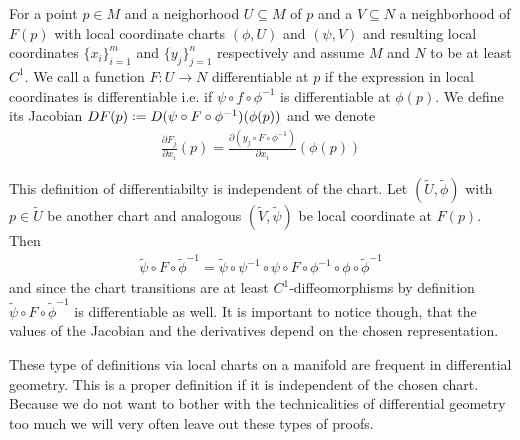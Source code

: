 \documentclass[12pt,a4paper]{article}
\numberwithin{equation}{subsection}
\numberwithin{lemma}{subsection}
\theoremstyle{definition}
\begin{document}
For a point $p \in M$ and a neighorhood $U \subseteq M$ of $p$ and 
a $V \subseteq N$ a neighborhood of $F(p)$ with local coordinate charts 
$(\phi, U)$ and $(\psi, V)$  and resulting local coordinates 
$\{x_i\}_{i=1}^m$ and $\{ y_j\}_{j=1}^n$ respectively and assume 
$M$ and $N$ to be at least $C^1$. We call a function 
$F: U \rightarrow N$ differentiable at $p$ if the expression in local coordinates
is differentiable i.e. if 
$\psi \circ f \circ \phi^{-1}$ is differentiable
at $\phi(p)$.
We define its Jacobian $DF(p) \vcentcolon= D(\psi \circ F \circ \phi^{-1})(\phi(p))$ 
and we denote 
\begin{align}
    \frac{\partial F_j}{\partial x_i}(p) 
    = \frac{\partial (y_j \circ F \circ \phi^{-1})}{\partial x_i} (\phi(p))
    \label{eq:derivative_on_manifold} 
\end{align}

This definition of differentiabilty is independent of the chart. 
Let $(\tilde{U},\tilde{\phi})$ with $p \in \tilde{U}$ be 
another chart and analogous $(\tilde{V},\tilde{\psi})$ be local coordinate 
at $F(p)$.
Then 
\begin{align*}
    \tilde{\psi} \circ F \circ \tilde{\phi}^{-1} 
    = \tilde{\psi} \circ \psi^{-1} \circ \psi \circ F \circ \phi^{-1} \circ \phi \circ \tilde{\phi}^{-1}
\end{align*}
and since the chart transitions are at least $C^1$-diffeomorphisms by definition
$\tilde{\psi} \circ F \circ \tilde{\phi}^{-1} $ is differentiable as well.
It is important to notice though, that the values of the Jacobian 
and the derivatives depend on the chosen representation.

These type of definitions via local charts on a manifold are frequent in
differential geometry. This is a proper definition if it is independent of the 
chosen chart. Because we do not want to bother with the technicalities of 
differential geometry too much we will very often leave out these types of
proofs.  
\end{document}
